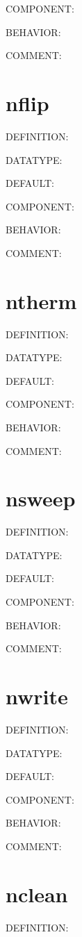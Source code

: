 {\color{brown}COMPONENT:}

{\color{purple}BEHAVIOR:}

{\color{olive}COMMENT:}

\section{nflip}
{\color{red}DEFINITION:}

{\color{green}DATATYPE:}

{\color{blue}DEFAULT:}

{\color{brown}COMPONENT:}

{\color{purple}BEHAVIOR:}

{\color{olive}COMMENT:}

\section{ntherm}
{\color{red}DEFINITION:}

{\color{green}DATATYPE:}

{\color{blue}DEFAULT:}

{\color{brown}COMPONENT:}

{\color{purple}BEHAVIOR:}

{\color{olive}COMMENT:}

\section{nsweep}
{\color{red}DEFINITION:}

{\color{green}DATATYPE:}

{\color{blue}DEFAULT:}

{\color{brown}COMPONENT:}

{\color{purple}BEHAVIOR:}

{\color{olive}COMMENT:}

\section{nwrite}
{\color{red}DEFINITION:}

{\color{green}DATATYPE:}

{\color{blue}DEFAULT:}

{\color{brown}COMPONENT:}

{\color{purple}BEHAVIOR:}

{\color{olive}COMMENT:}

\section{nclean}
{\color{red}DEFINITION:}

